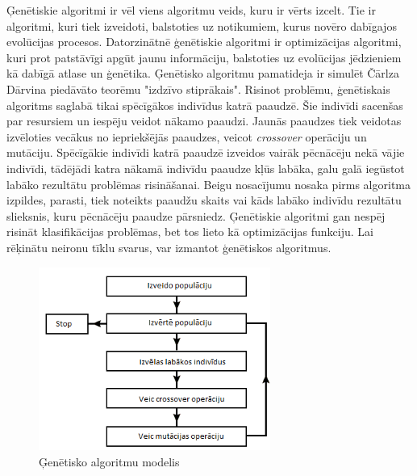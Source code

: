 \documentclass[12pt,paper=a4]{report}
\begin{document}
Ģenētiskie algoritmi ir vēl viens algoritmu veids, kuru ir vērts izcelt. Tie ir algoritmi, kuri tiek izveidoti, balstoties uz notikumiem, kurus novēro dabīgajos evolūcijas procesos. Datorzinātnē ģenētiskie algoritmi ir optimizācijas algoritmi, kuri prot patstāvīgi apgūt jaunu informāciju, balstoties uz evolūcijas jēdzieniem kā dabīgā atlase un ģenētika. Ģenētisko algoritmu pamatideja ir simulēt Čārlza Dārvina piedāvāto teorēmu "izdzīvo stiprākais". Risinot problēmu, ģenētiskais algoritms saglabā tikai spēcīgākos indivīdus katrā paaudzē. Šie indivīdi sacenšas par resursiem un iespēju veidot nākamo paaudzi. Jaunās paaudzes tiek veidotas izvēloties vecākus no iepriekšējās paaudzes, veicot \textit{crossover} operāciju un mutāciju. Spēcīgākie indivīdi katrā paaudzē izveidos vairāk pēcnācēju nekā vājie indivīdi, tādējādi katra nākamā indivīdu paaudze kļūs labāka, galu galā iegūstot labāko rezultātu problēmas risināšanai. Beigu nosacījumu nosaka pirms algoritma izpildes, parasti, tiek noteikts paaudžu skaits vai kāds labāko indivīdu rezultātu slieksnis, kuru pēcnācēju paaudze pārsniedz. Ģenētiskie algoritmi gan nespēj risināt klasifikācijas problēmas, bet tos lieto kā optimizācijas funkciju. Lai rēķinātu neironu tīklu svarus, var izmantot ģenētiskos algoritmus. \cite{genalg}
\begin{figure}[h]%
	\centering
	\includegraphics[height=6cm]{images/gen-algo-bilde.png} %
	\caption{Ģenētisko algoritmu modelis}%
	\label{fig:example}%
\end{figure}
\end{document}
